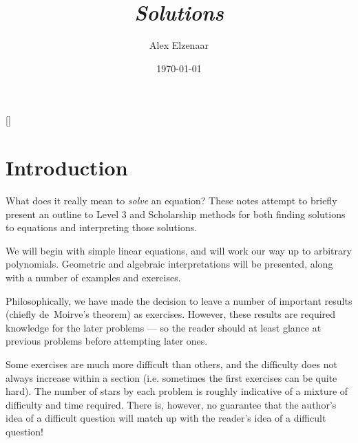 \documentclass[a4paper,10pt,titlepage]{article}
\title{\textbf{\textit{Solutions}}}
\author{Alex Elzenaar}%
\date{\today}
\theoremstyle{definition}
\begin{document}
\setcounter{tocdepth}{1}
\maketitle
\newpage\null\thispagestyle{empty}\newpage
{}

\tableofcontents

[{\titlerule[0.8pt]}]
\let\oldsection\section
\renewcommand\section{\clearpage\oldsection}

\section{Introduction}\label{sec:intro}
What does it really mean to \emph{solve} an equation? These notes attempt
to briefly present an outline to Level 3 and Scholarship methods for both finding
solutions to equations and interpreting those solutions.

We will begin with simple linear equations, and will work our way up to arbitrary
polynomials. Geometric and algebraic interpretations will be presented, along with
a number of examples and exercises.

Philosophically, we have made the decision to leave a number of important results
(chiefly de~Moirve's theorem) as exercises. However, these results are required
knowledge for the later problems --- so the reader should at least glance at previous
problems before attempting later ones.

Some exercises are much more difficult than others, and the difficulty does not
always increase within a section (i.e. sometimes the first exercises can be quite
hard). The number of stars by each problem is roughly indicative of a mixture of
difficulty and time required. There is, however, no guarantee that the author's
idea of a difficult question will match up with the reader's idea of a difficult
question!
\end{document}
